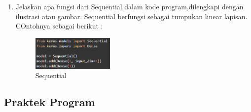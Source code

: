 \begin{enumerate}
	\item Jelaskan apa fungsi dari Sequential dalam kode program,dilengkapi dengan ilustrasi atau gambar.
	\hfill\break
	Sequential berfungsi sebagai tumpukan linear lapisan. COntohnya sebagai berikut :
	\begin{figure}[H]
		\includegraphics[width=4cm]{figures/1174087/6/7.png}
		\centering
		\caption{Sequential}
	\end{figure}

\end{enumerate}

\subsection{Praktek Program}
